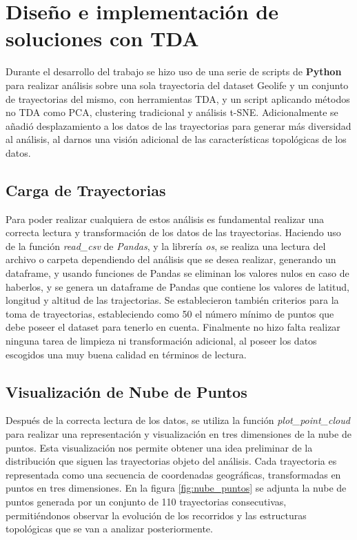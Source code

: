\section{Diseño e implementación de soluciones con TDA}

Durante el desarrollo del trabajo se hizo uso de una serie de scripts de \textbf{Python}  para realizar análisis sobre una sola trayectoria del dataset Geolife y un conjunto de trayectorias del mismo, con herramientas TDA, y un script aplicando métodos no TDA como PCA, clustering tradicional y análisis t-SNE. Adicionalmente se añadió desplazamiento a los datos de las trayectorias para generar más diversidad al análisis, al darnos una visión adicional de las características topológicas de los datos.

\subsection{Carga de Trayectorias}
Para poder realizar cualquiera de estos análisis es fundamental realizar una correcta lectura y transformación de los datos de las trayectorias. Haciendo uso de la función \textit{read\_csv} de \textit{Pandas}, y la librería \textit{os}, se realiza una lectura del archivo o carpeta dependiendo del análisis que se desea realizar, generando un dataframe, y usando funciones de Pandas se eliminan los valores nulos en caso de haberlos, y se genera un dataframe de Pandas que contiene los valores de latitud, longitud y altitud de las trajectorias. Se establecieron también criterios para la toma de trayectorias, estableciendo como 50 el número mínimo de puntos que debe poseer el dataset para tenerlo en cuenta. Finalmente no hizo falta realizar ninguna tarea de limpieza ni transformación adicional, al poseer los datos escogidos una muy buena calidad en términos de lectura.

\subsection{Visualización de Nube de Puntos}
Después de la correcta lectura de los datos, se utiliza la función \textit{plot\_point\_cloud } para realizar una representación y visualización en tres dimensiones de la nube de puntos. Esta visualización nos permite obtener una idea preliminar de la distribución que siguen las trayectorias objeto del análisis. Cada trayectoria es representada como una secuencia de coordenadas geográficas, transformadas en puntos en tres dimensiones. En la figura \ref{fig:nube_puntos} se adjunta la nube de puntos generada por un conjunto de 110 trayectorias consecutivas, permitiéndonos observar la evolución de los recorridos y las estructuras topológicas que se van a analizar posteriormente. 


